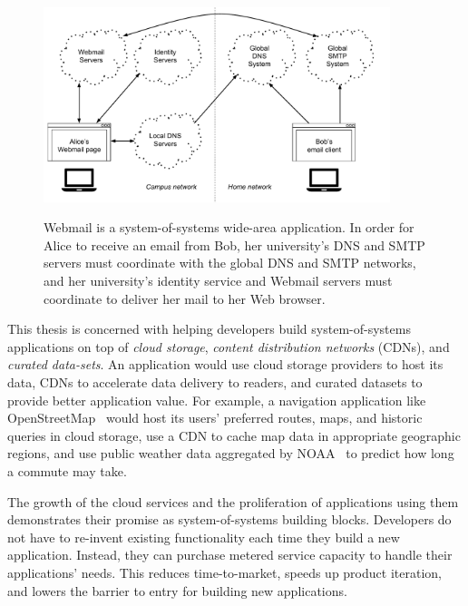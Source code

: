 \begin{figure}[h]
   \caption{Webmail is a system-of-systems wide-area application.  In order for
   Alice to receive an email from Bob, her university's DNS and SMTP servers
   must coordinate with the global DNS and SMTP networks, and her university's
   identity service and Webmail servers must coordinate to deliver her mail to
   her Web browser.}
   \centering
   \includegraphics[width=0.9\textwidth,page=1]{figures/dissertation-figures}
   \label{fig:chap1-system-of-systems}
\end{figure}

This thesis is concerned with helping developers build
system-of-systems applications on top of \emph{cloud storage},
\emph{content distribution networks} (CDNs), and \emph{curated data-sets}.
An application would use cloud storage providers to host
its data, CDNs to accelerate data delivery to readers,
and curated datasets to provide better application value.
For example, a navigation application like OpenStreetMap~\cite{openstreetmap}
would host its users' preferred routes, maps, and historic queries in cloud storage,
use a CDN to cache map data in appropriate geographic regions,
and use public weather data aggregated by NOAA~\cite{noaa} to predict how long a commute may take.

The growth of the cloud services and the proliferation of
applications using them demonstrates their promise as system-of-systems
building blocks.  Developers do not have to re-invent existing functionality
each time they build a new application.  Instead, they can
purchase metered service capacity to handle their applications' needs.
This reduces time-to-market, speeds up product iteration,
and lowers the barrier to entry for building new applications.

